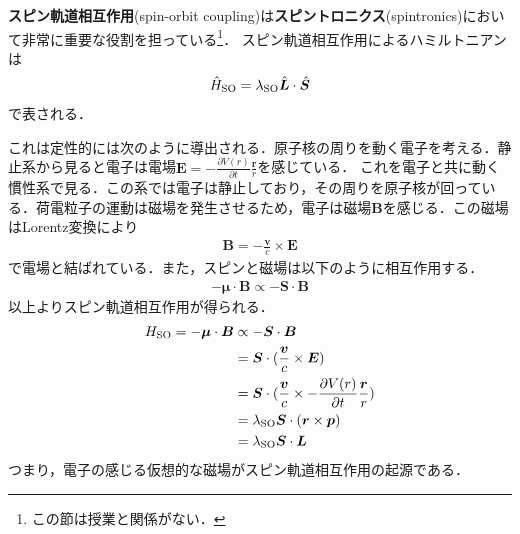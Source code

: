 \documentclass{report}
\begin{document}
  \textbf{スピン軌道相互作用}(spin-orbit coupling)は\textbf{スピントロニクス}(spintronics)において非常に重要な役割を担っている\footnote{この節は授業と関係がない．}．
  スピン軌道相互作用によるハミルトニアンは
  \begin{align}
    \hat{H}_{\mathrm{SO}} = \lambda_{\mathrm{SO}} \hat{\bm{L}} \cdot \hat{\bm{S}}
  \end{align}
  で表される．

  これは定性的には次のように導出される．原子核の周りを動く電子を考える．静止系から見ると電子は電場$\bm{E} = -\frac{\partial V(r)}{\partial t}\frac{\bm{r}}{r}$を感じている．
  これを電子と共に動く慣性系で見る．この系では電子は静止しており，その周りを原子核が回っている．荷電粒子の運動は磁場を発生させるため，電子は磁場$\bm{B}$を感じる．この磁場はLorentz変換により
  \begin{align}
    \bm{B} = -\frac{\bm{v}}{c} \times \bm{E}
  \end{align}
  で電場と結ばれている．また，スピンと磁場は以下のように相互作用する．
  \begin{align}
    -\bm{\mu}\cdot\bm{B} \propto -\bm{S}\cdot\bm{B}
  \end{align}
  以上よりスピン軌道相互作用が得られる．
  \begin{align}
    H_{\mathrm{SO}} = -\bm{\mu}\cdot\bm{B} &\propto -\bm{S}\cdot\bm{B}\\
    &= \bm{S} \cdot (\frac{\bm{v}}{c} \times \bm{E})\\
    &= \bm{S} \cdot(\frac{\bm{v}}{c} \times -\frac{\partial V(r)}{\partial t}\frac{\bm{r}}{r})\\
    &= \lambda_{\mathrm{SO}} \bm{S}\cdot(\bm{r} \times \bm{p})\\
    &= \lambda_{\mathrm{SO}} \bm{S} \cdot \bm{L}
  \end{align}
  つまり，電子の感じる仮想的な磁場がスピン軌道相互作用の起源である．
\end{document}
